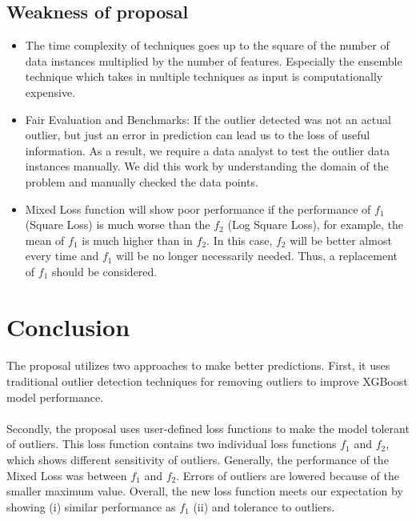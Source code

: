 \documentclass[runningheads]{llncs}
\begin{document}
\subsection{Weakness of proposal}
\begin{itemize}
    \item The time complexity of techniques goes up to the square of the number of data instances multiplied by the number of features. Especially the ensemble technique which takes in multiple techniques as input is computationally expensive.
    \item Fair Evaluation and Benchmarks: If the outlier detected was not an actual outlier, but just an error in prediction can lead us to the loss of useful information. As a result, we require a data analyst to test the outlier data instances manually. We did this work by understanding the domain of the problem and manually checked the data points.
    \item Mixed Loss function will show poor performance if the performance of $f_1$ (Square Loss) is much worse than the $f_2$ (Log Square Loss), for example, the mean of $f_1$ is much higher than in $f_2$. In this case, $f_2$ will be better almost every time and $f_1$ will be no longer necessarily needed. Thus, a replacement of $f_1$ should be considered.
\end{itemize}

\section{Conclusion}
\paragraph{} The proposal utilizes two approaches to make better predictions. First, it uses traditional outlier detection techniques for removing outliers to improve XGBoost model performance. 


\paragraph{} Secondly, the proposal uses user-defined loss functions to make the model tolerant of outliers. This loss function contains two individual loss functions $f_1$ and $f_2$, which shows different sensitivity of outliers. Generally, the performance of the Mixed Loss was between $f_1$ and $f_2$. Errors of outliers are lowered because of the smaller maximum value. Overall, the new loss function meets our expectation by showing (i) similar performance as $f_1$ (ii) and tolerance to outliers.
\end{document}
